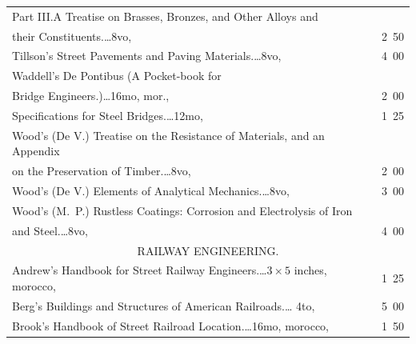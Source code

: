 \documentclass[a4paper,12pt]{book}[2004/02/16]
\theoremstyle{ilemma}
\theoremstyle{itheorem}
\theoremstyle{iother}
\theoremstyle{icorollary}
\theoremstyle{numcorollary}
\theoremstyle{idefinition}
\begin{document}
\begin{longtable}{@{}l@{ }r@{}}
\indent Part III.\quad A Treatise on Brasses, Bronzes, and Other
Alloys and\\

\nopagebreak

\indent\indent their Constituents.\dotfill\ldots 8vo, &2\ 50\\

Tillson's Street Pavements and Paving Materials.\dotfill\ldots 8vo, &4\ 00\\

Waddell's De Pontibus (A Pocket-book for\\

\nopagebreak

\indent\indent Bridge Engineers.)\dotfill\ldots 16mo, mor., &2\ 00\\

\nopagebreak

\indent Specifications for Steel Bridges.\dotfill\ldots 12mo, &1\ 25\\

Wood's (De V.) Treatise on the Resistance of Materials, and an Appendix\\

\nopagebreak

\indent\indent on the Preservation of Timber.\dotfill\ldots 8vo, &2\ 00\\

Wood's (De V.) Elements of Analytical Mechanics.\dotfill\ldots 8vo, &3\ 00\\

Wood's (M.~P.) Rustless Coatings: Corrosion and Electrolysis of Iron\\

\nopagebreak

\indent\indent and Steel.\dotfill\ldots 8vo, &4\ 00\\[2em]



\multicolumn{2}{c}{RAILWAY ENGINEERING.}\\[1em]

\nopagebreak

Andrew's Handbook for Street Railway Engineers.\dotfill\ldots $3\times
5$ inches, morocco, &1\ 25\\

Berg's Buildings and Structures of American Railroads.\dotfill\ldots
4to, &5\ 00\\

Brook's Handbook of Street Railroad Location.\dotfill\ldots 16mo,
morocco, &1\ 50\\


\end{longtable}
\end{document}

